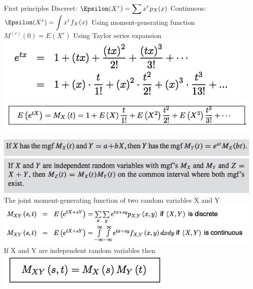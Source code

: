 \documentclass{/out/app/latex/examnotes}
\begin{document}
{\vspace{6pt}
\ra First principles
\vspace{6pt}
\rna Discreet: $\E(X^r)=\displaystyle\sum x^rp_X(x)$
\vspace{6pt}
\rna Continuous:  $\E(X^r)=\displaystyle\int x^rf_X(x)$
\vspace{6pt}
\ra Using moment-generating function
\vspace{6pt}
\rna $M^{(r)}(0)=E(X^r)$ 
\vspace{6pt}
\ra Using Taylor series expansion 
\includegraphics[scale=0.5]{./img/454.jpg}
\includegraphics[scale=0.5]{./img/455.jpg}

\includegraphics[scale=0.5]{./img/456.jpg}
\vspace{6pt}
\includegraphics[scale=0.5]{./img/457.jpg}
\vspace{6pt}
\ra The joint moment-generating function of two random variables X and Y 
\includegraphics[scale=0.5]{./img/458.jpg}
\ra If X and Y are independent random variables then
\includegraphics[scale=0.5]{./img/459.jpg}

}
\end{document}
